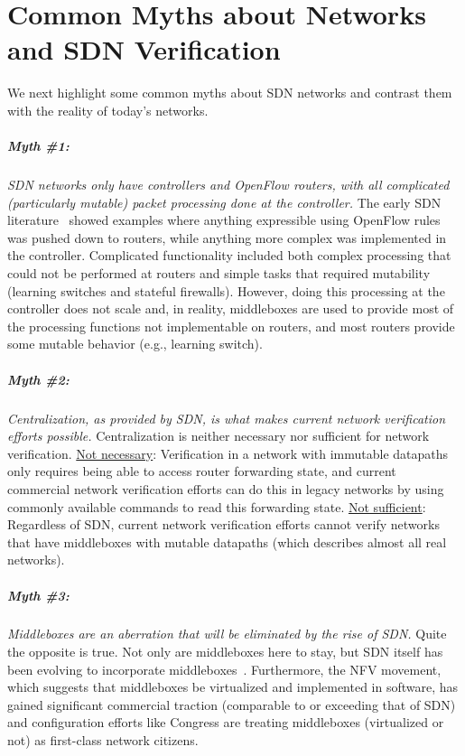 \section{Common Myths about Networks and SDN Verification}

We next highlight some common myths about SDN networks and contrast them with the reality of today's networks.


\subparagraph*{Myth \#1:} \emph{SDN networks only have controllers and OpenFlow routers, with all complicated (particularly mutable) packet processing done at the controller.} The early SDN literature~\cite{gude2008nox, monsanto2013composing} showed examples where anything expressible using OpenFlow rules was pushed down to routers, while anything more complex was implemented in the controller. Complicated functionality included both complex processing that could not be performed at routers and simple tasks that required mutability (\eg learning switches and stateful firewalls). However, doing this processing at the controller does not scale and, in reality, middleboxes are used to provide most of the processing functions not implementable on routers, and most routers provide some mutable behavior (e.g., learning switch).

\subparagraph*{Myth \#2:} \emph{Centralization, as provided by SDN, is what makes current network verification efforts possible.} Centralization is neither necessary nor sufficient for network verification. {\underline{Not necessary}:} Verification in a network with immutable datapaths only requires being able to access router forwarding state, and current commercial network verification efforts can do this in legacy networks by using commonly available commands to read this forwarding state. {\underline{Not sufficient}:} Regardless of SDN, current network verification efforts cannot verify networks that have middleboxes with mutable datapaths (which describes almost all real networks).

\subparagraph*{Myth \#3:} \emph{Middleboxes are an aberration that will be eliminated by the rise of SDN.} Quite the opposite is true. Not only are middleboxes here to stay, but SDN itself has been evolving to incorporate middleboxes~\cite{scottI2talk}. Furthermore, the NFV movement, which suggests that middleboxes be virtualized and implemented in software, has gained significant commercial traction (comparable to or exceeding that of SDN) and configuration efforts like Congress \cite{congress} are treating middleboxes (virtualized or not) as first-class network citizens.

